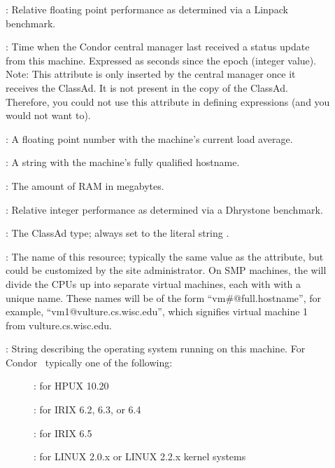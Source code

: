 \begin{description}
\item[] : Relative floating point performance as determined via a
Linpack benchmark.
%
\item[] : Time when the Condor central manager last
received a status update from this machine.  
Expressed as seconds since the epoch (integer value).
Note: This attribute is only inserted by the central manager once it
receives the ClassAd.
It is not present in the  copy of the ClassAd.
Therefore, you could not use this attribute in defining 
expressions (and you would not want to).
%
\item[] : A floating point number with the machine's current load
average.
%
\item[] : A string with the machine's fully qualified hostname.
%
\item[] : The amount of RAM in megabytes.
%
\item[] : Relative integer performance as determined via a Dhrystone
benchmark.
%
\item[] : The ClassAd type; always set to the literal string .
%
\item[] : The name of this resource; typically the same value as
the  attribute, but could be customized by the site
administrator.
On SMP machines, the  will divide the CPUs up into separate
virtual machines, each with with a unique name.
These names will be of the form ``vm\#@full.hostname'', for example,
``vm1@vulture.cs.wisc.edu'', which signifies virtual machine 1 from
vulture.cs.wisc.edu. 
%
\item[] : String describing the operating system running on this
machine.  For Condor \VersionNotice\ typically one of the following:
	\begin{description}
	\item[] : for HPUX 10.20
	\item[] : for IRIX 6.2, 6.3, or 6.4
	\item[] : for IRIX 6.5
	\item[] : for LINUX 2.0.x or LINUX 2.2.x kernel systems

\end{description}
\end{description}
